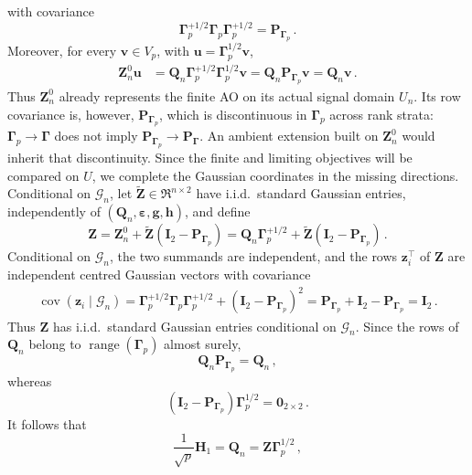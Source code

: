 \documentclass{article}
\DeclareMathOperator{\cov}{cov}
\theoremstyle{definition}
\newcommand*{\bb}{\boldsymbol}
\def\bH {\bb{H}}
\def\bu{\bb{u}}
\def\bv{\bb{v}}
\def\bh{\bb{h}}
\def\bg{\bb{g}}
\def\bz{\bb{z}}
\def\bH{\bb{H}}
\newcommand{\range}{\operatorname{range}}
\begin{document}
\begin{bibunit}
with covariance
$$
    \bb\Gamma_p^{+1/2}
    \bb\Gamma_p
    \bb\Gamma_p^{+1/2}
    =
    \bb P_{\bb \Gamma_p}\,.
$$
Moreover, for every $\bv\in V_p$, with
$\bu=\bb\Gamma_p^{1/2}\bv$,
$$
\begin{aligned}
    \bb Z_n^0\bu
    &=
    \bb Q_n
    \bb\Gamma_p^{+1/2}
    \bb\Gamma_p^{1/2}
    \bv
    =
    \bb Q_n
    \bb P_{\bb \Gamma_p}
    \bv
    =
    \bb Q_n\bv\,.
\end{aligned}
$$
Thus $\bb Z_n^0$ already represents the finite AO on its actual signal
domain $U_n$. Its row covariance is, however, $\bb P_{\bb \Gamma_p}$, which is discontinuous
in $\bb\Gamma_p$ across rank strata: $\bb\Gamma_p\to\bb\Gamma$ does not
imply $\bb P_{\bb \Gamma_p}\to\bb P_{\bb \Gamma}$. An ambient extension built on
$\bb Z_n^0$ would inherit that discontinuity. Since the finite and limiting
objectives will be compared on $U$, we complete the Gaussian coordinates in
the missing directions.
Conditional on $\mathcal G_n$, let
$\widetilde{\bb Z}\in\Re^{n\times2}$ have i.i.d.\ standard Gaussian
entries, independently of
$(\bb Q_n,\bb\varepsilon,\bg,\bh)$, and define
\begin{equation}
\label{eq:ao_H_completion}
    \bb Z
    =
    \bb Z_n^0
    +
    \widetilde{\bb Z}
    \left(
        \bb I_2-\bb P_{\bb \Gamma_p}
    \right)
    =
    \bb Q_n\bb\Gamma_p^{+1/2}
    +
    \widetilde{\bb Z}
    \left(
        \bb I_2-\bb P_{\bb \Gamma_p}
    \right)\,.
\end{equation}
Conditional on $\mathcal G_n$, the two summands are independent, and the
rows $\bz_i^\top$ of $\bb Z$ are independent centred Gaussian vectors with
covariance
$$
\begin{aligned}
    \cov(
        \bz_i
        \mid
        \mathcal G_n
    )
    =
    \bb\Gamma_p^{+1/2}
    \bb\Gamma_p
    \bb\Gamma_p^{+1/2}
    +
    \left(
        \bb I_2-\bb P_{\bb \Gamma_p}
    \right)^2
   =
    \bb P_{\bb \Gamma_p}
    +
    \bb I_2-\bb P_{\bb \Gamma_p}
    =
    \bb I_2\,.
\end{aligned}
$$
Thus $\bb Z$ has i.i.d.\ standard Gaussian entries conditional on
$\mathcal G_n$. Since the rows of $\bb Q_n$ belong to
$\range(\bb\Gamma_p)$ almost surely,
$$
    \bb Q_n\bb P_{\bb \Gamma_p}
    =
    \bb Q_n\,,
$$
whereas
$$
    \left(
        \bb I_2-\bb P_{\bb \Gamma_p}
    \right)
    \bb\Gamma_p^{1/2}
    =
    \bb0_{2\times2}\,.
$$
It follows that
\begin{equation}
\label{eq:ao_H_repar}
    \frac1{\sqrt p}\bH_1
    =
    \bb Q_n
    =
    \bb Z\bb\Gamma_p^{1/2}\,,
\end{equation}

\end{bibunit}
\end{document}
